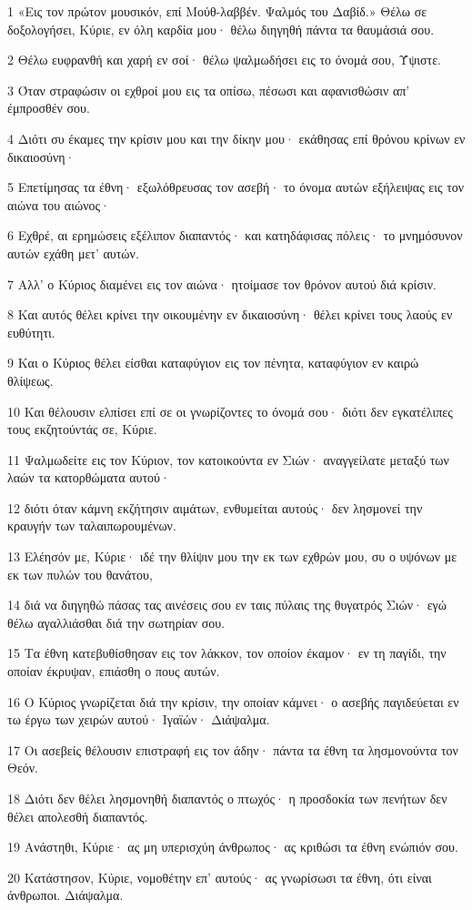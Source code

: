 \par 1 «Εις τον πρώτον μουσικόν, επί Μούθ-λαββέν. Ψαλμός του Δαβίδ.» Θέλω σε δοξολογήσει, Κύριε, εν όλη καρδία μου· θέλω διηγηθή πάντα τα θαυμάσιά σου.
\par 2 Θέλω ευφρανθή και χαρή εν σοί· θέλω ψαλμωδήσει εις το όνομά σου, Ύψιστε.
\par 3 Όταν στραφώσιν οι εχθροί μου εις τα οπίσω, πέσωσι και αφανισθώσιν απ' έμπροσθέν σου.
\par 4 Διότι συ έκαμες την κρίσιν μου και την δίκην μου· εκάθησας επί θρόνου κρίνων εν δικαιοσύνη·
\par 5 Επετίμησας τα έθνη· εξωλόθρευσας τον ασεβή· το όνομα αυτών εξήλειψας εις τον αιώνα του αιώνος·
\par 6 Εχθρέ, αι ερημώσεις εξέλιπον διαπαντός· και κατηδάφισας πόλεις· το μνημόσυνον αυτών εχάθη μετ' αυτών.
\par 7 Αλλ' ο Κύριος διαμένει εις τον αιώνα· ητοίμασε τον θρόνον αυτού διά κρίσιν.
\par 8 Και αυτός θέλει κρίνει την οικουμένην εν δικαιοσύνη· θέλει κρίνει τους λαούς εν ευθύτητι.
\par 9 Και ο Κύριος θέλει είσθαι καταφύγιον εις τον πένητα, καταφύγιον εν καιρώ θλίψεως.
\par 10 Και θέλουσιν ελπίσει επί σε οι γνωρίζοντες το όνομά σου· διότι δεν εγκατέλιπες τους εκζητούντάς σε, Κύριε.
\par 11 Ψαλμωδείτε εις τον Κύριον, τον κατοικούντα εν Σιών· αναγγείλατε μεταξύ των λαών τα κατορθώματα αυτού·
\par 12 διότι όταν κάμνη εκζήτησιν αιμάτων, ενθυμείται αυτούς· δεν λησμονεί την κραυγήν των ταλαιπωρουμένων.
\par 13 Ελέησόν με, Κύριε· ιδέ την θλίψιν μου την εκ των εχθρών μου, συ ο υψόνων με εκ των πυλών του θανάτου,
\par 14 διά να διηγηθώ πάσας τας αινέσεις σου εν ταις πύλαις της θυγατρός Σιών· εγώ θέλω αγαλλιάσθαι διά την σωτηρίαν σου.
\par 15 Τα έθνη κατεβυθίσθησαν εις τον λάκκον, τον οποίον έκαμον· εν τη παγίδι, την οποίαν έκρυψαν, επιάσθη ο πους αυτών.
\par 16 Ο Κύριος γνωρίζεται διά την κρίσιν, την οποίαν κάμνει· ο ασεβής παγιδεύεται εν τω έργω των χειρών αυτού· Ιγαϊών· Διάψαλμα.
\par 17 Οι ασεβείς θέλουσιν επιστραφή εις τον άδην· πάντα τα έθνη τα λησμονούντα τον Θεόν.
\par 18 Διότι δεν θέλει λησμονηθή διαπαντός ο πτωχός· η προσδοκία των πενήτων δεν θέλει απολεσθή διαπαντός.
\par 19 Ανάστηθι, Κύριε· ας μη υπερισχύη άνθρωπος· ας κριθώσι τα έθνη ενώπιόν σου.
\par 20 Κατάστησον, Κύριε, νομοθέτην επ' αυτούς· ας γνωρίσωσι τα έθνη, ότι είναι άνθρωποι. Διάψαλμα.


